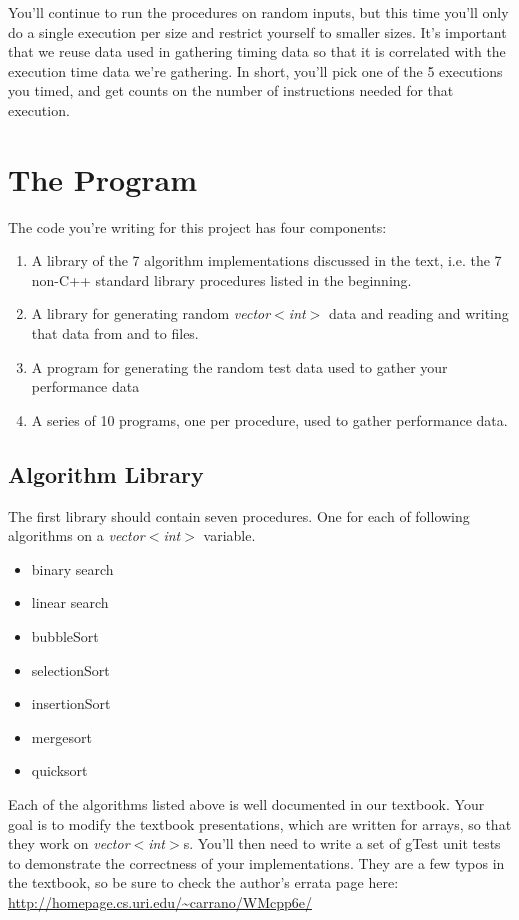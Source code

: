 \documentclass[]{tufte-handout}
\begin{document}
You'll continue to run the procedures on random inputs, but this time you'll only do a single execution per size and restrict yourself to smaller sizes. It's important that we reuse data used in gathering timing data so that it is correlated with the execution time data we're gathering. In short, you'll pick one of the 5 executions you timed, and get counts on the number of instructions needed for that execution.  

\section{The Program}

The code you're writing for this project has four components:
\begin{enumerate}
\item A library of the 7 algorithm implementations discussed in the text, i.e. the 7 non-C++ standard library procedures listed in the beginning.
\item A library for generating random \textit{vector$<$int$>$} data and reading and writing that data from and to files.
\item A program for generating the random test data used to gather your performance data
\item A series of 10 programs, one per procedure, used to gather performance data.
\end{enumerate}

\subsection{Algorithm Library}
The first library should contain seven procedures. One for each of following algorithms on a \textit{vector$<$int$>$} variable.
\begin{itemize}
\item binary search 
\item linear search
\item bubbleSort
\item selectionSort
\item insertionSort
\item mergesort
\item quicksort
\end{itemize}
Each of the algorithms listed above is well documented in our textbook. Your goal is to modify the textbook presentations, which are written for arrays, so that they work on  
\textit{vector$<$int$>$}s. You'll then need to write a set of gTest unit tests to demonstrate the correctness of your implementations. They are a few typos in the textbook, so be sure to check the author's errata page here: \url{http://homepage.cs.uri.edu/~carrano/WMcpp6e/}
\end{document}
